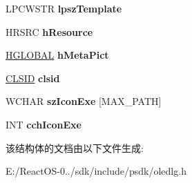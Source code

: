 \begin{DoxyCompactItemize}
\item 
\mbox{\label{structtag_o_l_e_u_i_c_h_a_n_g_e_i_c_o_n_w_a512707c3aba3aac3a4911e24551396b9}} 
L\+P\+C\+W\+S\+TR {\bfseries lpsz\+Template}
\item 
\mbox{\label{structtag_o_l_e_u_i_c_h_a_n_g_e_i_c_o_n_w_ad7c9101dd94cadc02c4e2fd858fd4ec8}} 
H\+R\+S\+RC {\bfseries h\+Resource}
\item 
\mbox{\label{structtag_o_l_e_u_i_c_h_a_n_g_e_i_c_o_n_w_a0d87ac6e0758a28f35a509adbbf01043}} 
\hyperlink{interfacevoid}{H\+G\+L\+O\+B\+AL} {\bfseries h\+Meta\+Pict}
\item 
\mbox{\label{structtag_o_l_e_u_i_c_h_a_n_g_e_i_c_o_n_w_a7d892f9d72f7676839cf9b28f3f992f5}} 
\hyperlink{struct___i_i_d}{C\+L\+S\+ID} {\bfseries clsid}
\item 
\mbox{\label{structtag_o_l_e_u_i_c_h_a_n_g_e_i_c_o_n_w_a0b97bad54932d99844ebc45d04cc8d63}} 
W\+C\+H\+AR {\bfseries sz\+Icon\+Exe} \mbox{[}M\+A\+X\+\_\+\+P\+A\+TH\mbox{]}
\item 
\mbox{\label{structtag_o_l_e_u_i_c_h_a_n_g_e_i_c_o_n_w_afb037b2433369b317213a20d002b0cd0}} 
I\+NT {\bfseries cch\+Icon\+Exe}
\end{DoxyCompactItemize}


该结构体的文档由以下文件生成\+:\begin{DoxyCompactItemize}
\item 
E\+:/\+React\+O\+S-\/0../sdk/include/psdk/oledlg.\+h\end{DoxyCompactItemize}
